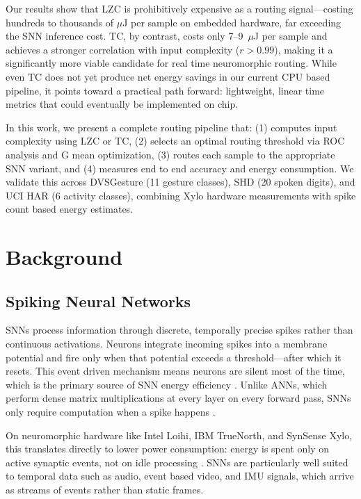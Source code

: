 \documentclass[conference]{IEEEtran}
\begin{document}
Our results show that LZC is prohibitively expensive as a routing signal—costing hundreds to thousands of $\mu$J per sample on embedded hardware, far exceeding the SNN inference cost. TC, by contrast, costs only 7--9~$\mu$J per sample and achieves a stronger correlation with input complexity ($r > 0.99$), making it a significantly more viable candidate for real time neuromorphic routing. While even TC does not yet produce net energy savings in our current CPU based pipeline, it points toward a practical path forward: lightweight, linear time metrics that could eventually be implemented on chip.

In this work, we present a complete routing pipeline that: (1) computes input complexity using LZC or TC, (2) selects an optimal routing threshold via ROC analysis and G mean optimization, (3) routes each sample to the appropriate SNN variant, and (4) measures end to end accuracy and energy consumption. We validate this across DVSGesture (11 gesture classes), SHD (20 spoken digits), and UCI HAR (6 activity classes), combining Xylo hardware measurements with spike count based energy estimates.

\section{Background}

\subsection{Spiking Neural Networks}

SNNs process information through discrete, temporally precise spikes rather than continuous activations. Neurons integrate incoming spikes into a membrane potential and fire only when that potential exceeds a threshold—after which it resets. This event driven mechanism means neurons are silent most of the time, which is the primary source of SNN energy efficiency \cite{rieke1997spikes, maass1997thirdgen}. Unlike ANNs, which perform dense matrix multiplications at every layer on every forward pass, SNNs only require computation when a spike happens \cite{rueckauer2017conversionSNN}.

On neuromorphic hardware like Intel Loihi, IBM TrueNorth, and SynSense Xylo, this translates directly to lower power consumption: energy is spent only on active synaptic events, not on idle processing \cite{davies2018loihi, akopyan2015truenorth}. SNNs are particularly well suited to temporal data such as audio, event based video, and IMU signals, which arrive as streams of events rather than static frames.
\end{document}
